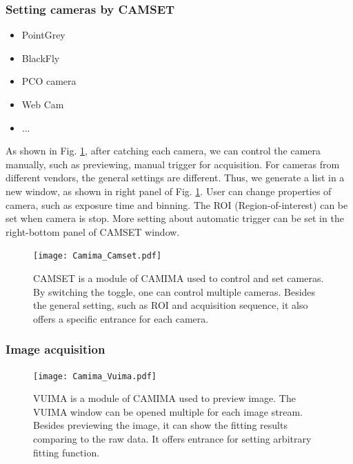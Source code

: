 \subsubsection{Setting cameras by CAMSET}

\begin{itemize}[noitemsep,topsep=0pt]
    \item PointGrey
    \item BlackFly
    \item PCO camera
    \item Web Cam
    \item ...
\end{itemize}

As shown in Fig. \ref{Camima_Camset}, after catching each camera, we can control the camera manually, such as previewing, manual trigger for acquisition. For cameras from different vendors, the general settings are different. Thus, we generate a list in a new window, as shown in right panel of Fig. \ref{Camima_Camset}. User can change properties of camera, such as exposure time and binning. The ROI (Region-of-interest) can be set when camera is stop. More setting about automatic trigger can be set in the right-bottom panel of CAMSET window.

\begin{figure}[htb]
\begin{center}
\texttt{[image: Camima\_Camset.pdf]}
\end{center}
\caption[CAMSET: a module of CAMIMA used to control and set cameras]{CAMSET is a module of CAMIMA used to control and set cameras. By switching the toggle, one can control multiple cameras. Besides the general setting, such as ROI and acquisition sequence, it also offers a specific entrance for each camera.}
\label{Camima_Camset}
\end{figure}

\subsubsection{Image acquisition}


\begin{figure}[htb]
\begin{center}
\texttt{[image: Camima\_Vuima.pdf]}
\end{center}
\caption[VUIMA: a module of CAMIMA used to preview image]{VUIMA is a module of CAMIMA used to preview image. The VUIMA window can be opened multiple for each image stream. Besides previewing the image, it can show the fitting results comparing to the raw data. It offers entrance for setting arbitrary fitting function.}
\label{Camima_Vuima}
\end{figure}

